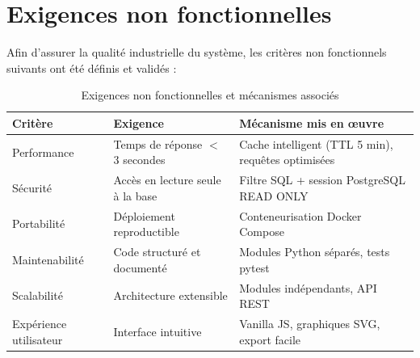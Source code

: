 \documentclass[a4paper,12pt]{report}
\begin{document}
\section{Exigences non fonctionnelles}
\begin{doublespace}
Afin d'assurer la qualité industrielle du système, les critères non fonctionnels suivants ont été définis et validés :

\begin{table}[H]
\centering
\begin{tabular}{|p{3cm}|p{5cm}|p{5cm}|}
    \hline
    \textbf{Critère} & \textbf{Exigence} & \textbf{Mécanisme mis en œuvre} \\
    \hline
    Performance & Temps de réponse $<$ 3 secondes & Cache intelligent (TTL 5 min), requêtes optimisées \\
    \hline
    Sécurité & Accès en lecture seule à la base & Filtre SQL + session PostgreSQL READ ONLY \\
    \hline
    Portabilité & Déploiement reproductible & Conteneurisation Docker Compose \\
    \hline
    Maintenabilité & Code structuré et documenté & Modules Python séparés, tests pytest \\
    \hline
    Scalabilité & Architecture extensible & Modules indépendants, API REST \\
    \hline
    Expérience utilisateur & Interface intuitive & Vanilla JS, graphiques SVG, export facile \\
    \hline
\end{tabular}
\caption{Exigences non fonctionnelles et mécanismes associés}
\label{tab:non_functional}
\end{table}
\end{doublespace}
\end{document}
